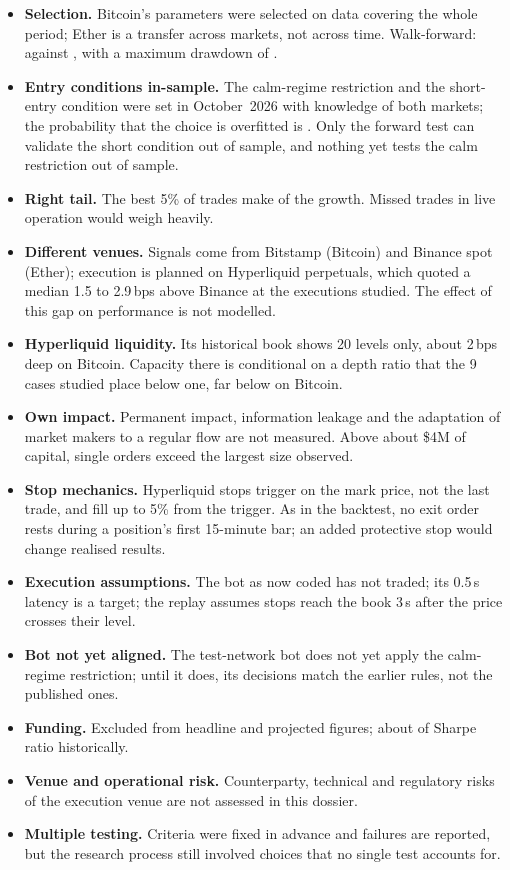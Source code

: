 \documentclass[11pt,a4paper]{article}
\newcommand{\bps}{\,bps}
\begin{document}
\begin{itemize}
\item \textbf{Selection.} Bitcoin's parameters were selected on data covering the whole period; Ether is a transfer across markets,
  not across time. Walk-forward: \WfSharpe{} against \WfPreset, with a maximum drawdown of \WfDD.
\item \textbf{Entry conditions in-sample.} The calm-regime restriction and the short-entry condition were set in October~2026 with
  knowledge of both markets; the probability that the choice is overfitted is \Pbo. Only the forward test can validate the short
  condition out of sample, and nothing yet tests the calm restriction out of sample.
\item \textbf{Right tail.} The best 5\% of trades make \TopFive{} of the growth. Missed trades in live operation would weigh heavily.
\item \textbf{Different venues.} Signals come from Bitstamp (Bitcoin) and Binance spot (Ether); execution is planned on Hyperliquid
  perpetuals, which quoted a median 1.5 to 2.9\bps{} above Binance at the executions studied. The effect of this gap on performance
  is not modelled.
\item \textbf{Hyperliquid liquidity.} Its historical book shows 20 levels only, about 2\bps{} deep on Bitcoin. Capacity there is
  conditional on a depth ratio that the 9 cases studied place below one, far below on Bitcoin.
\item \textbf{Own impact.} Permanent impact, information leakage and the adaptation of market makers to a regular flow are not
  measured. Above about \$4M of capital, single orders exceed the largest size observed.
\item \textbf{Stop mechanics.} Hyperliquid stops trigger on the mark price, not the last trade, and fill up to 5\% from the trigger.
  As in the backtest, no exit order rests during a position's first 15-minute bar; an added protective stop would change realised
  results.
\item \textbf{Execution assumptions.} The bot as now coded has not traded; its 0.5\,s latency is a target; the replay assumes stops
  reach the book 3\,s after the price crosses their level.
\item \textbf{Bot not yet aligned.} The test-network bot does not yet apply the calm-regime restriction; until it does, its
  decisions match the earlier rules, not the published ones.
\item \textbf{Funding.} Excluded from headline and projected figures; about \FundingDrag{} of Sharpe ratio historically.
\item \textbf{Venue and operational risk.} Counterparty, technical and regulatory risks of the execution venue are not assessed in
  this dossier.
\item \textbf{Multiple testing.} Criteria were fixed in advance and failures are reported, but the research process still involved
  choices that no single test accounts for.
\end{itemize}
\end{document}
